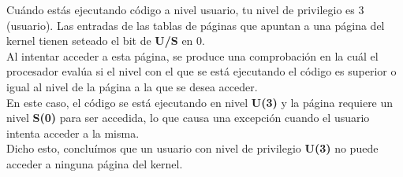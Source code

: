 Cuándo estás ejecutando código a nivel usuario, tu nivel de privilegio es 3 (usuario). Las entradas de las tablas de páginas que apuntan a una página del kernel tienen seteado el bit de \textbf{U/S} en 0.\\

Al intentar acceder a esta página, se produce una comprobación en la cuál el procesador evalúa si el nivel con el que se está ejecutando el código es superior o igual al nivel de la página a la que se desea acceder.\\
En este caso, el código se está ejecutando en nivel \textbf{U(3)} y la página requiere un nivel \textbf{S(0)} para ser accedida, lo que causa una excepción cuando el usuario intenta acceder a la misma.\\

Dicho esto, concluímos que un usuario con nivel de privilegio \textbf{U(3)} no puede acceder a ninguna página del kernel.